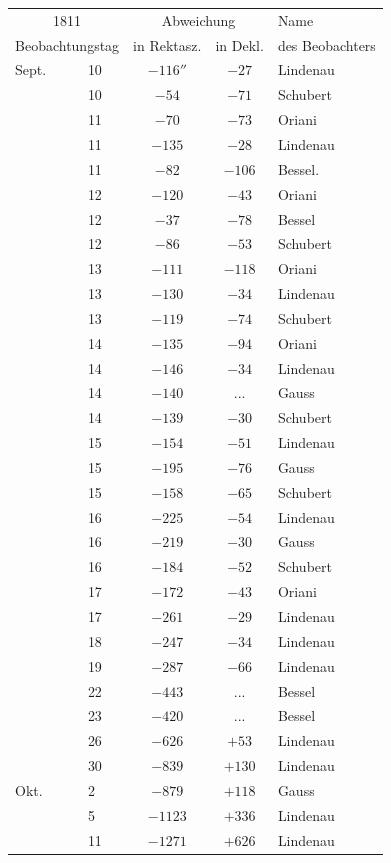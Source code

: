 \begin{center}

\fontsize{10}{12}\selectfont\setlength{\tabcolsep}{7pt}\renewcommand{\arraystretch}{1.05}\begin{tabular}{ll|c|c|l}
\multicolumn{2}{c|}{1811} & \multicolumn{2}{c|}{Abweichung} & Name \\
\multicolumn{2}{c|}{Beobachtungstag} & in Rektasz. & in Dekl. & des Beobachters \\\hline
Sept. & 10 & $-116''$ & $-27$ & Lindenau \\
 & 10 & $-54$ & $-71$ & Schubert \\
 & 11 & $-70$ & $-73$ & Oriani \\
 & 11 & $-135$ & $-28$ & Lindenau \\
 & 11 & $-82$ & $-106$ & Bessel. \\
 & 12 & $-120$ & $-43$ & Oriani \\
 & 12 & $-37$ & $-78$ & Bessel \\
 & 12 & $-86$ & $-53$ & Schubert \\
 & 13 & $-111$ & $-118$ & Oriani \\
 & 13 & $-130$ & $-34$ & Lindenau \\
 & 13 & $-119$ & $-74$ & Schubert \\
 & 14 & $-135$ & $-94$ & Oriani \\
 & 14 & $-146$ & $-34$ & Lindenau \\
 & 14 & $-140$ & .\;.\;. & Gauss \\
 & 14 & $-139$ & $-30$ & Schubert \\
 & 15 & $-154$ & $-51$ & Lindenau \\
 & 15 & $-195$ & $-76$ & Gauss \\
 & 15 & $-158$ & $-65$ & Schubert \\
 & 16 & $-225$ & $-54$ & Lindenau \\
 & 16 & $-219$ & $-30$ & Gauss \\
 & 16 & $-184$ & $-52$ & Schubert \\
 & 17 & $-172$ & $-43$ & Oriani \\
 & 17 & $-261$ & $-29$ & Lindenau \\
 & 18 & $-247$ & $-34$ & Lindenau \\
 & 19 & $-287$ & $-66$ & Lindenau \\
 & 22 & $-443$ & .\;.\;. & Bessel \\
 & 23 & $-420$ & .\;.\;. & Bessel \\
 & 26 & $-626$ & $+53$ & Lindenau \\
 & 30 & $-839$ & $+130$ & Lindenau \\
Okt. & 2 & $-879$ & $+118$ & Gauss \\
 & 5 & $-1123$ & $+336$ & Lindenau \\
 & 11 & $-1271$ & $+626$ & Lindenau \\
\end{tabular}

\end{center}

